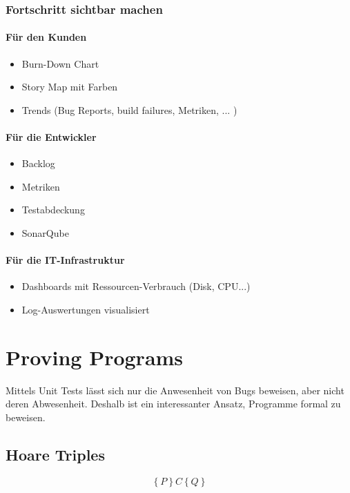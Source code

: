 \subsubsection{Fortschritt sichtbar machen}

\paragraph{Für den Kunden}
\begin{itemize}
	\item Burn-Down Chart
	\item Story Map mit Farben
	\item Trends (Bug Reports, build failures, Metriken, ... )
\end{itemize}

\paragraph{Für die Entwickler}
\begin{itemize}
	\item Backlog
	\item Metriken
	\item Testabdeckung
	\item SonarQube
\end{itemize}

\paragraph{Für die IT-Infrastruktur}
\begin{itemize}
	\item Dashboards mit Ressourcen-Verbrauch (Disk, CPU...)
	\item Log-Auswertungen visualisiert
\end{itemize}


\section{Proving Programs}

Mittels Unit Tests lässt sich nur die Anwesenheit von Bugs beweisen, aber nicht deren Abwesenheit. Deshalb ist ein interessanter Ansatz, Programme formal zu beweisen.

\subsection{Hoare Triples}

\[ \left\{P\right\} C \left\{Q\right\} \]

